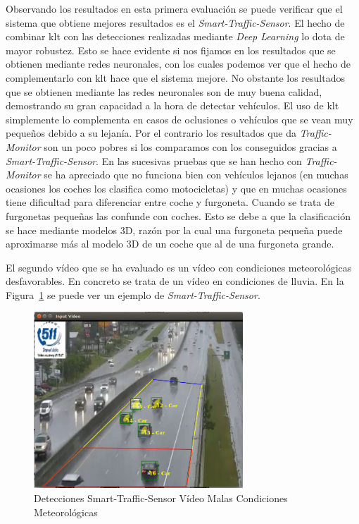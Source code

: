 Observando los resultados en esta primera evaluación se puede verificar que el sistema que obtiene mejores resultados es el \textit{Smart-Traffic-Sensor}. El hecho de combinar \acrshort{klt} con las detecciones realizadas mediante \textit{Deep Learning} lo dota de mayor robustez. Esto se hace evidente si nos fijamos en los resultados que se obtienen mediante redes neuronales, con los cuales podemos ver que el hecho de complementarlo con \acrshort{klt} hace que el sistema mejore. No obstante los resultados que se obtienen mediante las redes neuronales son de muy buena calidad, demostrando su gran capacidad a la hora de detectar vehículos. El uso de \acrshort{klt} simplemente lo complementa en casos de oclusiones o vehículos que se vean muy pequeños debido a su lejanía. Por el contrario los resultados que da \textit{Traffic-Monitor} son un poco pobres si los comparamos con los conseguidos gracias a \textit{Smart-Traffic-Sensor}. En las sucesivas pruebas que se han hecho con \textit{Traffic-Monitor} se ha apreciado que no funciona bien con vehículos lejanos (en muchas ocasiones los coches los clasifica como motocicletas) y que en muchas ocasiones tiene dificultad para diferenciar entre coche y furgoneta. Cuando se trata de furgonetas pequeñas las confunde con coches. Esto se debe a que la clasificación se hace mediante modelos 3D, razón por la cual una furgoneta pequeña puede aproximarse más al modelo 3D de un coche que al de una furgoneta grande.


El segundo vídeo que se ha evaluado es un vídeo con condiciones meteorológicas desfavorables. En concreto se trata de un vídeo en condiciones de lluvia. En la Figura~\ref{fig.video_malas_condiciones} se puede ver un ejemplo de \textit{Smart-Traffic-Sensor}.

\begin{figure}[H] 
\begin{center}
	\includegraphics[width=0.7\textwidth]{figures/Experimentos/sts_malas_condiciones.png}
   \caption{Detecciones Smart-Traffic-Sensor Vídeo Malas Condiciones Meteorológicas}
	\label{fig.video_malas_condiciones}
\end{center}
\end{figure}


